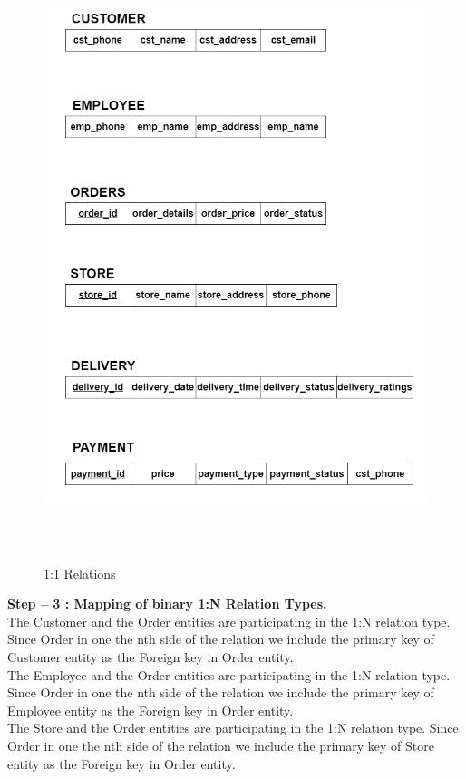 \documentclass[12pt,a4paper]{report}
\begin{document}
\begin{figure}[hbtp]
\centering
\includegraphics[width=6in,height=7in]{../fig/1to1 (1)}
\caption{1:1 Relations}
\end{figure} 
\newpage
\noindent\textbf{Step – 3 : Mapping of binary 1:N Relation Types.}\\
The Customer and the Order entities are participating in the 1:N relation type. Since Order in one the nth side of the relation we include the primary key of Customer entity as the Foreign key in Order entity.\\
The Employee and the Order entities are participating in the 1:N relation type. Since Order in one the nth side of the relation we include the primary key of Employee entity as the Foreign key in Order entity.\\
The Store and the Order entities are participating in the 1:N relation type. Since Order in one the nth side of the relation we include the primary key of Store entity as the Foreign key in Order entity.\\
\end{document}

